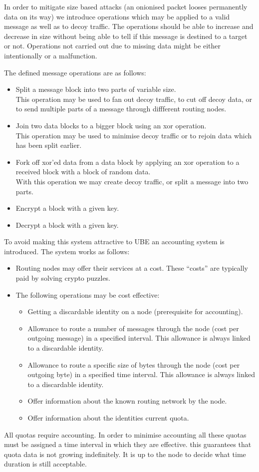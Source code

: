In order to mitigate size based attacks (an onionised packet looses permanently data on its way) we introduce operations which may be applied to a valid message as well as to decoy traffic. The operations should be able to increase and decrease in size without being able to tell if this message is destined to a target or not. Operations not carried out due to missing data might be either intentionally or a malfunction.

The defined message operations are as follows:
\begin{itemize}
	\item Split a message block into two parts of variable size.\\
	This operation may be used to fan out decoy traffic, to cut off decoy data, or to send multiple parts of a message through diffferent routing nodes.
	\item Join two data blocks to a bigger block using an xor operation.\\
	This operation may be used to minimise decoy traffic or to rejoin data which has been split earlier.
	\item Fork off xor'ed data from a data block by applying an xor operation to a received block with a block of random data.\\
	With this operation we may create decoy traffic, or split a message into two parts.
	\item Encrypt a block with a given key.      
	\item Decrypt a block with a given key.
\end{itemize}

To avoid making this system attractive to UBE an accounting system is introduced. The system works as follows:
\begin{itemize}
	\item Routing nodes may offer their services at a cost. These ``costs'' are typically paid by solving crypto puzzles.
	\item The following operations may be cost effective:
	\begin{itemize}
		\item Getting a discardable identity on a node (prerequisite for accounting).
		\item Allowance to route a number of messages through the node (cost per outgoing message) in a specified interval. This allowance is always linked to a discardable identity.
		\item Allowance to route a specific size of bytes through the node (cost per outgoing byte) in a specified time interval. This allowance is always linked to a discardable identity.
		\item Offer information about the known routing network by the node.
		\item Offer information about the identities current quota.
	\end{itemize}
\end{itemize}
All quotas require accounting. In order to minimise accounting all these quotas must be assigned a time interval in which they are effective. this guarantees that quota data is not growing indefinitely. It is up to the node to decide what time duration is still acceptable.

